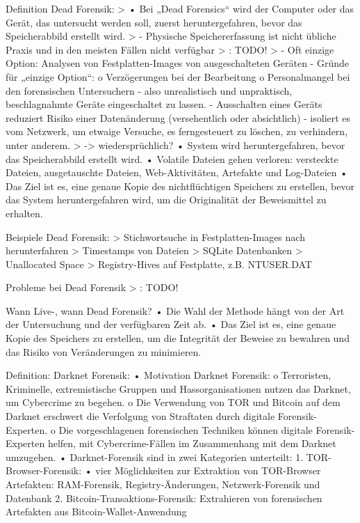 Definition Dead Forensik:
	> \cite{Izzati.2022}
		•	Bei „Dead Forensics“ wird der Computer oder das Gerät, das untersucht werden soll, zuerst heruntergefahren, bevor das Speicherabbild erstellt wird.
	> \cite{Horsman.2019}
		-	Physische Speichererfassung ist nicht übliche Praxis und in den meisten Fällen nicht verfügbar
	> \cite{Hassan.2019}: TODO!
	> \cite{Mahlous.2020}
		-	Oft einzige Option: Analysen von Festplatten-Images von ausgeschalteten Geräten 
		-	Gründe für „einzige Option“:
			o	Verzögerungen bei der Bearbeitung 
			o	Personalmangel bei den forensischen Untersuchern 
		-	also unrealistisch und unpraktisch, beschlagnahmte Geräte eingeschaltet zu lassen.
		-	Ausschalten eines Geräts reduziert Risiko einer Datenänderung (versehentlich oder absichtlich) 
		-	isoliert es vom Netzwerk, um etwaige Versuche, es ferngesteuert zu löschen, zu verhindern, unter anderem.
	> \cite{Izzati.2022} -> wiedersprüchlich?
		•	System wird heruntergefahren, bevor das Speicherabbild erstellt wird.
		•	Volatile Dateien gehen verloren: versteckte Dateien, ausgetauschte Dateien, Web-Aktivitäten, Artefakte und Log-Dateien 
		•	Das Ziel ist es, eine genaue Kopie des nichtflüchtigen Speichers zu erstellen, bevor das System heruntergefahren wird, um die Originalität der Beweismittel zu erhalten.
		
Beispiele Dead Forensik:
	> Stichwortsuche in Festplatten-Images nach herunterfahren \cite{Satvat.2014}
	> Timestamps von Dateien \cite{Satvat.2014}
	> SQLite Datenbanken \cite{Satvat.2014}
	> Unallocated Space \cite{Satvat.2014}
	> Registry-Hives auf Festplatte, z.B. NTUSER.DAT \cite{Satvat.2014}
	

Probleme bei Dead Forensik 
	> \cite{Gupta.2013}: TODO!


Wann Live-, wann Dead Forensik? \cite{Izzati.2022} %
	•	Die Wahl der Methode hängt von der Art der Untersuchung und der verfügbaren Zeit ab.
	•	Das Ziel ist es, eine genaue Kopie des Speichers zu erstellen, um die Integrität der Beweise zu bewahren und das Risiko von Veränderungen zu minimieren.

	
Definition: Darknet Forensik: \cite{Rathod.2017} %
	•	Motivation Darknet Forensik:
		o	Terroristen, Kriminelle, extremistische Gruppen und Hassorganisationen nutzen das Darknet, um Cybercrime zu begehen.
		o	Die Verwendung von TOR und Bitcoin auf dem Darknet erschwert die Verfolgung von Straftaten durch digitale Forensik-Experten.
		o	Die vorgeschlagenen forensischen Techniken können digitale Forensik-Experten helfen, mit Cybercrime-Fällen im Zusammenhang mit dem Darknet umzugehen.
	•	Darknet-Forensik sind in zwei Kategorien unterteilt: 
		1.	TOR-Browser-Forensik:
		•	vier Möglichkeiten zur Extraktion von TOR-Browser Artefakten: RAM-Forensik, Registry-Änderungen, Netzwerk-Forensik und Datenbank
		2.	Bitcoin-Transaktions-Forensik: Extrahieren von forensischen Artefakten aus Bitcoin-Wallet-Anwendung
		
